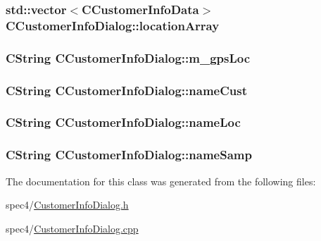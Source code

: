 \hypertarget{classCCustomerInfoDialog_a52af4f801fc841e234c685f7211b5fa3}{
\subsubsection[{locationArray}]{\setlength{\rightskip}{0pt plus 5cm}std::vector$<${\bf CCustomerInfoData}$>$ {\bf CCustomerInfoDialog::locationArray}}}
\label{classCCustomerInfoDialog_a52af4f801fc841e234c685f7211b5fa3}
\hypertarget{classCCustomerInfoDialog_abea1dd37fe0b172b4adbfb0c8bedbb09}{
\subsubsection[{m\_\-gpsLoc}]{\setlength{\rightskip}{0pt plus 5cm}CString {\bf CCustomerInfoDialog::m\_\-gpsLoc}}}
\label{classCCustomerInfoDialog_abea1dd37fe0b172b4adbfb0c8bedbb09}
\hypertarget{classCCustomerInfoDialog_a326798c7c4e0ba24e2468fde8da2a6b8}{
\subsubsection[{nameCust}]{\setlength{\rightskip}{0pt plus 5cm}CString {\bf CCustomerInfoDialog::nameCust}}}
\label{classCCustomerInfoDialog_a326798c7c4e0ba24e2468fde8da2a6b8}
\hypertarget{classCCustomerInfoDialog_a50878f665714c3d50f518a7c7a0ad5a8}{
\subsubsection[{nameLoc}]{\setlength{\rightskip}{0pt plus 5cm}CString {\bf CCustomerInfoDialog::nameLoc}}}
\label{classCCustomerInfoDialog_a50878f665714c3d50f518a7c7a0ad5a8}
\hypertarget{classCCustomerInfoDialog_a5ba07e15af46921ad7d9ed647d59f707}{
\subsubsection[{nameSamp}]{\setlength{\rightskip}{0pt plus 5cm}CString {\bf CCustomerInfoDialog::nameSamp}}}
\label{classCCustomerInfoDialog_a5ba07e15af46921ad7d9ed647d59f707}


The documentation for this class was generated from the following files:\begin{DoxyCompactItemize}
\item 
spec4/\hyperlink{CustomerInfoDialog_8h}{CustomerInfoDialog.h}\item 
spec4/\hyperlink{CustomerInfoDialog_8cpp}{CustomerInfoDialog.cpp}\end{DoxyCompactItemize}
